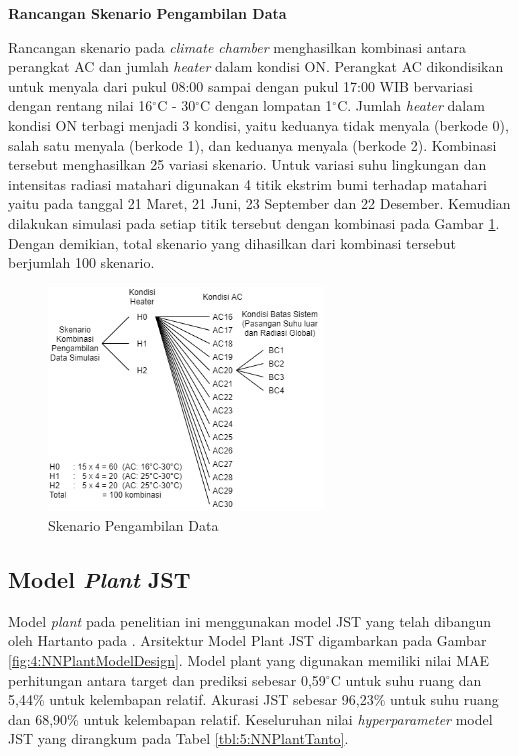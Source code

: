 \noindent\textbf{Rancangan Skenario Pengambilan Data}

Rancangan skenario pada \textit{climate chamber} menghasilkan kombinasi antara perangkat AC dan jumlah \textit{heater} dalam kondisi ON. Perangkat AC dikondisikan untuk menyala dari pukul 08:00 sampai dengan pukul 17:00 WIB bervariasi dengan rentang nilai 16$^\circ$C - 30$^\circ$C dengan lompatan 1$^\circ$C. Jumlah \textit{heater} dalam kondisi ON terbagi menjadi 3 kondisi, yaitu keduanya tidak menyala (berkode 0), salah satu menyala (berkode 1), dan keduanya menyala (berkode 2). Kombinasi tersebut menghasilkan 25 variasi skenario. Untuk variasi suhu lingkungan dan intensitas radiasi matahari digunakan 4 titik ekstrim bumi terhadap matahari yaitu pada tanggal 21 Maret, 21 Juni, 23 September dan 22 Desember. Kemudian dilakukan simulasi pada setiap titik tersebut dengan kombinasi pada Gambar \ref{fig:4:SkenarioData}. Dengan demikian, total skenario yang dihasilkan dari kombinasi tersebut berjumlah 100 skenario.

\begin{figure}[!h]
	\centering
	\includegraphics[width=0.65\textwidth]{figures/SkenarioData}
	\caption{Skenario Pengambilan Data}
	\label{fig:4:SkenarioData}
\end{figure}
\vspace{1em}
\break
\break

\subsection{Model \textit{Plant} JST}
Model \textit{plant} pada penelitian ini menggunakan model JST yang telah dibangun oleh Hartanto pada \cite{skripsiTanto}. Arsitektur Model Plant JST digambarkan pada Gambar \ref{fig:4:NNPlantModelDesign}. Model plant yang digunakan memiliki nilai MAE perhitungan antara target dan prediksi sebesar 0,59$^{\circ}$C untuk suhu ruang dan 5,44\% untuk kelembapan relatif. Akurasi JST sebesar 96,23\% untuk suhu ruang dan 68,90\% untuk kelembapan relatif. Keseluruhan nilai \textit{hyperparameter} model JST yang dirangkum pada Tabel \ref{tbl:5:NNPlantTanto}.

